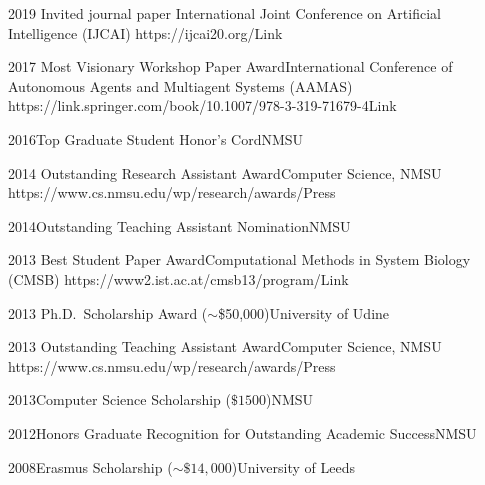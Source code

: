 \begin{awards}
	\awardentry
	{2019}
	{Invited journal paper}%
	{International Joint Conference on Artificial Intelligence (IJCAI)}
	{https://ijcai20.org/}{Link}

	\awardentry
	{2017}
	{Most Visionary Workshop Paper Award}{International Conference of 
	Autonomous Agents and Multiagent Systems (AAMAS)}
   {https://link.springer.com/book/10.1007/978-3-319-71679-4}{Link}

\awardentryN
{2016}{Top Graduate Student Honor's Cord}{NMSU}

\awardentry
	{2014}
	{Outstanding Research Assistant Award}{Computer Science, NMSU}
	{https://www.cs.nmsu.edu/wp/research/awards/}{Press}

\awardentryN
	{2014}{Outstanding Teaching Assistant Nomination}{NMSU}

	\awardentry
	{2013}
	{Best Student Paper Award}{Computational Methods in System Biology (CMSB)}
	{https://www2.ist.ac.at/cmsb13/program/}{Link}

\awardentryN
	{2013}
	{Ph.D.~Scholarship Award ($\sim$\$50,000)}{University of Udine}

\awardentry 
   {2013}
   {Outstanding Teaching Assistant Award}{Computer Science, NMSU}
   {https://www.cs.nmsu.edu/wp/research/awards/}{Press}

\awardentryN
{2013}{Computer Science Scholarship ($\$ 1500$)}{NMSU}

\awardentryN
{2012}{Honors Graduate Recognition for Outstanding Academic Success}{NMSU}

\awardentryN
{2008}{Erasmus Scholarship ($\sim \$ 14,000$)}{University of Leeds}

\end{awards}

